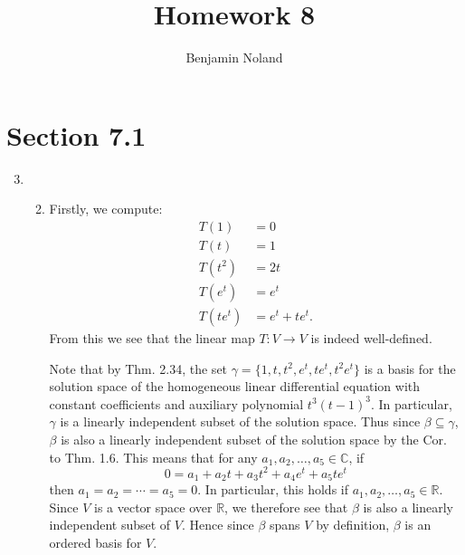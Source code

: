 \documentclass[12pt]{article}
\title{Homework 8}
\author{Benjamin Noland}
\date{}
\begin{document}
\maketitle

\section*{Section 7.1}

\begin{enumerate}
\setcounter{enumi}{2}
\item
\begin{enumerate}
\setcounter{enumii}{1}
\item
Firstly, we compute:
\begin{align*}
T(1) &= 0 \\
T(t) &= 1 \\
T(t^2) &= 2t \\
T(e^t) &= e^t \\
T(te^t) &= e^t + te^t.
\end{align*}
From this we see that the linear map $T : V \to V$ is indeed well-defined.

Note that by Thm. 2.34, the set $\gamma = \{1, t, t^2, e^t, te^t, t^2e^t\}$ is a basis for the solution space of the homogeneous linear differential equation with constant coefficients and auxiliary polynomial $t^3(t-1)^3$. In particular, $\gamma$ is a linearly independent subset of the solution space. Thus since $\beta \subseteq \gamma$, $\beta$ is also a linearly independent subset of the solution space by the Cor. to Thm. 1.6. This means that for any $a_1, a_2, \dots, a_5 \in \mathbb{C}$, if
\begin{equation*}
0 = a_1 + a_2 t + a_3 t^2 + a_4 e^t + a_5 te^t 
\end{equation*}
then $a_1 = a_2 = \cdots = a_5 = 0$. In particular, this holds if $a_1, a_2, \dots, a_5 \in \mathbb{R}$. Since $V$ is a vector space over $\mathbb{R}$, we therefore see that $\beta$ is also a linearly independent subset of $V$. Hence since $\beta$ spans $V$ by definition, $\beta$ is an ordered basis for $V$.


\end{enumerate}
\end{enumerate}
\end{document}
